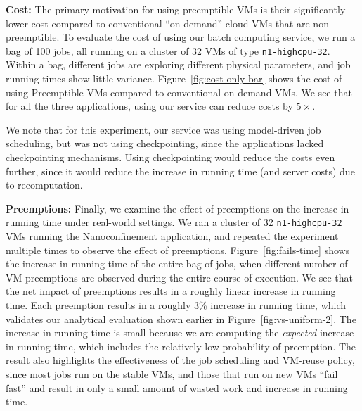 \noindent \textbf{Cost:}
The primary motivation for using preemptible VMs is their significantly lower cost compared to conventional ``on-demand'' cloud VMs that are non-preemptible.
To evaluate the cost of using our batch computing service, we run a bag of 100 jobs, all running on a cluster of 32 VMs of type \texttt{n1-highcpu-32}. 
Within a bag, different jobs are exploring different physical parameters, and job running times show little variance. 
Figure~\ref{fig:cost-only-bar} shows the cost of using Preemptible VMs compared to conventional on-demand VMs.
We see that for all the three applications, using our service can reduce costs by $5\times$.

We note that for this experiment, our  service was using model-driven job scheduling, but was not using checkpointing, since the applications lacked checkpointing mechanisms.
Using checkpointing would reduce the costs even further, since it would reduce the increase in running time (and server costs) due to recomputation.


\noindent \textbf{Preemptions:} 
Finally, we examine the effect of preemptions on the increase in running time under real-world settings.
We ran a cluster of 32 \texttt{n1-highcpu-32} VMs running the Nanoconfinement application, and repeated the experiment multiple times to observe the effect of preemptions.
Figure~\ref{fig:fails-time} shows the increase in running time of the entire bag of jobs, when different number of VM preemptions are observed during the entire course of execution.
We see that the net impact of preemptions results in a roughly linear increase in running time. 
Each preemption results in a roughly 3\% increase in running time, which validates our analytical evaluation shown earlier in Figure~\ref{fig:vs-uniform-2}.
The increase in running time is small because we are computing the \emph{expected} increase in running time, which includes the relatively low probability of preemption. 
The result also highlights the effectiveness of the job scheduling and VM-reuse policy, since most jobs run on the stable VMs, and  those that run on new VMs ``fail fast'' and result in only a small amount of wasted work and increase in running time. 





